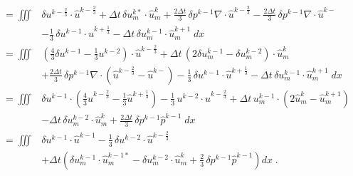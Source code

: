 \[ \begin{split}
 =  \iiint & \delta u^{k-\frac23} \cdot \hat u^{k-\frac23}
  + \Delta t\, \delta u_m^{k*} \cdot \hat u_m^k
  + \frac{2\Delta t}3\, \delta p^{k-1} \nabla \cdot \hat u^{k-\frac23}
  - \frac{2 \Delta t}3\, \delta p^{k-1} \nabla \cdot \hat u^{k-} \\
 &- \frac13\, \delta u^{k-1} \cdot \hat u^{k+\frac13}
  - \Delta t\, \delta u_m^{k-1} \cdot \hat u_m^{k+1}\; dx \\
 =  \iiint & \left( \frac43 \delta u^{k-1} - \frac13 u^{k-2} \right)
            \cdot \hat u^{k-\frac23}
  + \Delta t\, \left(2 \delta u_m^{k-1} - \delta u_m^{k-2}\right)
               \cdot \hat u_m^k \\
 &+ \frac{2\Delta t}3\, \delta p^{k-1} \nabla \cdot
    \left( \hat u^{k-\frac23} - \hat u^{k-} \right)
  - \frac13\, \delta u^{k-1} \cdot \hat u^{k+\frac13}
  - \Delta t\, \delta u_m^{k-1} \cdot \hat u_m^{k+1}\; dx \\
 =  \iiint &  \delta u^{k-1} \cdot \left( \frac43 \hat u^{k-\frac23}
                                    - \frac13 \hat u^{k+\frac13} \right)
  - \frac13\, u^{k-2} \cdot \hat u^{k-\frac23}
  + \Delta t\, u_m^{k-1} \cdot \left(2 \hat u_m^k - \hat u_m^{k+1} \right) \\
 &- \Delta t\, \delta u_m^{k-2} \cdot \hat u_m^k
  + \frac{2\Delta t}3\, \delta p^{k-1} \hat p^{k-1}\; dx \\
 =  \iiint & \delta u^{k-1} \cdot \hat u^{k-1} -
    \frac13\, \delta u^{k-2} \cdot \hat u^{k-\frac23} \\
 &+ \Delta t \left( \delta u_m^{k-1} \cdot \hat u_m^{k-1*} -
                    \delta u_m^{k-2} \cdot \hat u_m^k
                 + \frac23\, \delta p^{k-1} \hat p^{k-1} \right) dx \;.
\end{split}\]
